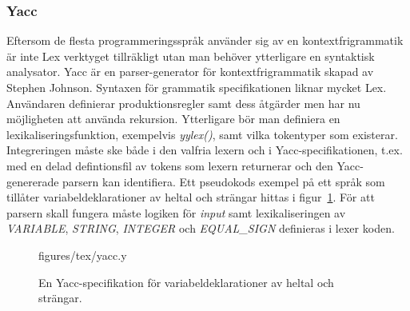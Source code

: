 \subsubsection{Yacc}

Eftersom de flesta programmeringsspråk använder sig av en kontextfrigrammatik
är inte Lex verktyget tillräkligt utan man behöver ytterligare en syntaktisk
analysator. Yacc är en parser-generator för kontextfrigrammatik skapad av
Stephen Johnson. Syntaxen för grammatik specifikationen liknar mycket Lex.
Användaren definierar produktionsregler samt dess åtgärder men har nu
möjligheten att använda rekursion. Ytterligare bör man definiera en
lexikaliseringsfunktion, exempelvis \textit{yylex()}, samt vilka tokentyper
som existerar. Integreringen måste ske både i den valfria lexern och i
Yacc-specifikationen, t.ex. med en delad defintionsfil av tokens som lexern
returnerar och den Yacc-genererade parsern kan identifiera. Ett pseudokods
exempel på ett språk som tillåter variabeldeklarationer av heltal och strängar
hittas i figur~\ref{fig:yacc}. För att parsern skall fungera måste logiken för
\textit{input} samt lexikaliseringen av \textit{VARIABLE}, \textit{STRING},
\textit{INTEGER} och \textit{EQUAL_SIGN} definieras i lexer koden.

\begin{figure}[ht]
    {figures/tex/yacc.y}
  \caption{En Yacc-specifikation för variabeldeklarationer av heltal och
    strängar.}
  \label{fig:yacc}
\end{figure}

